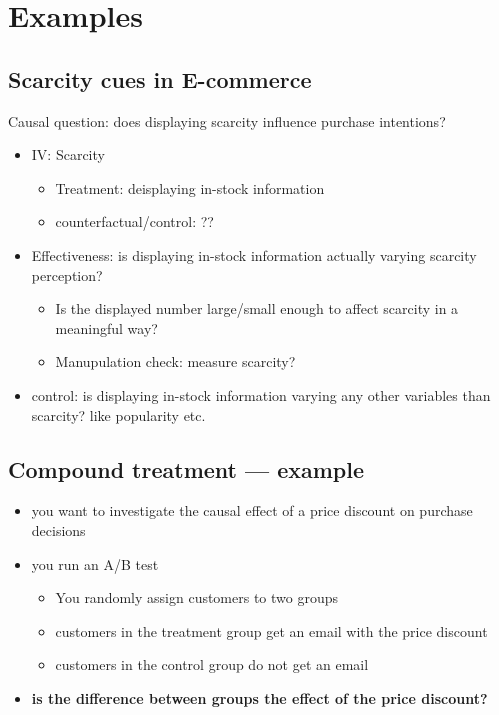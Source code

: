 \documentclass[10pt]{article}
\begin{document}
\section{Examples}
\subsection{Scarcity cues in E-commerce}
Causal question: does displaying scarcity influence purchase intentions?
\begin{itemize}
    \item IV: Scarcity
    \begin{itemize}
        \item Treatment: deisplaying in-stock information
        \item counterfactual/control: ??
    \end{itemize}
    \item Effectiveness: is displaying in-stock information actually varying scarcity perception?
    \begin{itemize}
        \item Is the displayed number large/small enough to affect scarcity in a meaningful way?
        \item Manupulation check: measure scarcity?
    \end{itemize}
    \item control: is displaying in-stock information varying any other variables than scarcity? like popularity etc. 
\end{itemize}
\subsection{Compound treatment --- example}
\begin{itemize}
    \item you want to investigate the causal effect of a price discount on purchase decisions 
    \item you run an A/B test 
    \begin{itemize}
        \item You randomly assign customers to two groups 
        \item customers in the treatment group get an email with the price discount 
        \item customers in the control group do not get an email 
    \end{itemize}
    \item \textbf{is the difference between groups the effect of the price discount?}
\end{itemize}
\newpage
\end{document}
